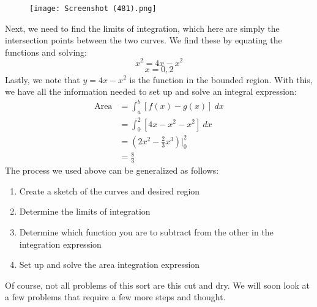 \documentclass[11pt]{scrartcl}
\begin{document}
\begin{figure}[htp]
    \centering
    \texttt{[image: Screenshot (481).png]}

\end{figure}
\noindent 
Next, we need to find the limits of integration, which here are simply the intersection points between the two curves. We find these by equating the functions and solving: 
$$x^2=4x-x^2$$
$$x=0,2$$
\noindent 
Lastly, we note that $y=4x-x^2$ is the  function in the bounded region. With this, we have all the information needed to set up and solve an integral expression:
\begin{align*}
    \text{Area} &= \int_a^b [f(x)-g(x)] \ dx \\
                &= \int_0^2 [4x-x^2-x^2] \ dx \\
                &= \left(2x^2-\frac{2}{3}x^3\right) \biggr \rvert_0^2 \\
                &=\frac{8}{3}
\end{align*}
The process we used above can be generalized as follows: 
\begin{enumerate}
    \item Create a sketch of the curves and desired region
    \item Determine the limits of integration 
    \item Determine which function you are to subtract from the other in the integration expression 
    \item Set up and solve the area integration expression 
\end{enumerate}
\noindent 
Of course, not all problems of this sort are this cut and dry. We will soon look at a few problems that require a few more steps and thought.
\end{document}
